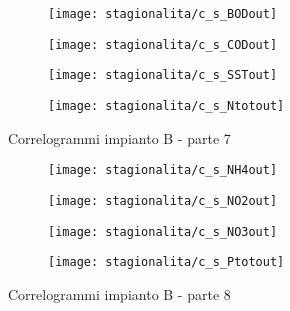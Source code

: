 \begin{sidewaysfigure}[h]\ContinuedFloat
	\renewcommand*\thesubfigure{(\arabic{subfigure})}
	\begin{subfigure}{0.49\textwidth}
		\texttt{[image: stagionalita/c\_s\_BODout]}
		\caption{}
		\centering
	\end{subfigure}
	\begin{subfigure}{0.49\textwidth}
		\texttt{[image: stagionalita/c\_s\_CODout]}
		\caption{}
		\centering
	\end{subfigure}

	\begin{subfigure}{0.49\textwidth}
		\texttt{[image: stagionalita/c\_s\_SSTout]}
		\caption{}
		\centering
	\end{subfigure}
	\begin{subfigure}{0.49\textwidth}
		\texttt{[image: stagionalita/c\_s\_Ntotout]}	
		\caption{}
		\centering
	\end{subfigure}
	\caption{Correlogrammi impianto B - parte 7}
\end{sidewaysfigure}

\clearpage

\begin{sidewaysfigure}[h]\ContinuedFloat
	\renewcommand*\thesubfigure{(\arabic{subfigure})}
	\begin{subfigure}{0.49\textwidth}
		\texttt{[image: stagionalita/c\_s\_NH4out]}
		\caption{}
		\label{fig:c_s_NH4out}
		\centering
	\end{subfigure}
	\begin{subfigure}{0.49\textwidth}
		\texttt{[image: stagionalita/c\_s\_NO2out]}
		\caption{}
		\centering
	\end{subfigure}

	\begin{subfigure}{0.49\textwidth}
		\texttt{[image: stagionalita/c\_s\_NO3out]}
		\caption{}
		\centering
	\end{subfigure}
	\begin{subfigure}{0.49\textwidth}
		\texttt{[image: stagionalita/c\_s\_Ptotout]}	
		\caption{}
		\centering
	\end{subfigure}
	\caption{Correlogrammi impianto B - parte 8}
\end{sidewaysfigure}

